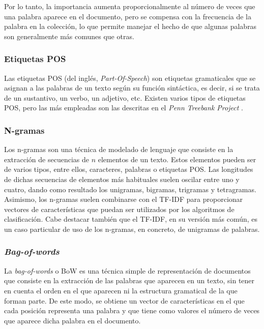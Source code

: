 \bigskip
Por lo tanto, la importancia aumenta proporcionalmente al número de veces que una palabra aparece en el documento, pero se compensa con la frecuencia
de la palabra en la colección, lo que permite manejar el hecho de que algunas palabras son generalmente más comunes que otras.

\subsubsection{Etiquetas POS}

Las etiquetas POS (del inglés, \textit{Part-Of-Speech}) son etiquetas gramaticales que se asignan a las palabras de un texto según su función sintáctica, es
decir, si se trata de un sustantivo, un verbo, un adjetivo, etc.
Existen varios tipos de etiquetas POS, pero las más empleadas son las descritas en el \textit{Penn Treebank Project} \cite{marcus1993building}.

\subsubsection{N-gramas}

Los n-gramas son una técnica de modelado de lenguaje que consiste en la extracción de secuencias de $n$ elementos de un texto. Estos elementos pueden ser de varios
tipos, entre ellos, caracteres, palabras o etiquetas POS. Las longitudes de dichas secuencias de elementos más habituales suelen oscilar entre uno y cuatro, dando como resultado los unigramas, bigramas,
trigramas y tetragramas.
Asimismo, los n-gramas suelen combinarse con el TF-IDF para proporcionar vectores de características que puedan ser utilizados por los algoritmos de clasificación.
Cabe destacar también que el TF-IDF, en su versión más común, es un caso particular de uso de los n-gramas, en concreto, de unigramas de palabras.

\subsubsection{\textit{Bag-of-words}}
\label{sec:bag_of_words}

La \textit{bag-of-words} o BoW es una técnica simple de representación de documentos que consiste en la extracción de las palabras que aparecen en un texto,
sin tener en cuenta el orden en el que aparecen ni la estructura gramatical de la que forman parte. De este modo, se obtiene un vector de características en el
que cada posición representa una palabra y que tiene como valores el número de veces que aparece dicha palabra en el documento.

